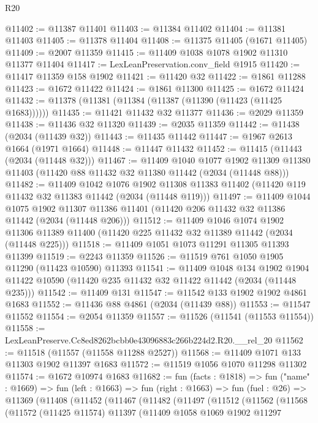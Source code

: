 \begin{lexlean}{R20}
\begin{coremodule}
@11402 := @11387 @11401
@11403 := @11384 @11402
@11404 := @11381 @11403
@11405 := @11378 @11404
@11408 := @11375 @11405 (@1671 @11405)
@11409 := @2007 @11359
@11415 := @11409 @1038 @1078 @1902 @11310 @11377 @11404
@11417 := LexLeanPreservation.conv_field @1915
@11420 := @11417 @11359 @158 @1902
@11421 := @11420 @32
@11422 := @1861 @11288
@11423 := @1672 @11422
@11424 := @1861 @11300
@11425 := @1672 @11424
@11432 := @11378 (@11381 (@11384 (@11387 (@11390 (@11423 (@11425 @1683))))))
@11435 := @11421 @11432 @32 @11377
@11436 := @2029 @11359
@11438 := @11436 @32 @11320
@11439 := @2035 @11359
@11442 := @11438 (@2034 (@11439 @32))
@11443 := @11435 @11442
@11447 := @1967 @2613 @1664 (@1971 @1664)
@11448 := @11447 @11432
@11452 := @11415 (@11443 (@2034 (@11448 @32)))
@11467 := @11409
    @1040
    @1077
    @1902
    @11309
    @11380
    @11403
    (@11420 @88 @11432 @32 @11380 @11442 (@2034 (@11448 @88)))
@11482 := @11409
    @1042
    @1076
    @1902
    @11308
    @11383
    @11402
    (@11420 @119 @11432 @32 @11383 @11442 (@2034 (@11448 @119)))
@11497 := @11409
    @1044
    @1075
    @1902
    @11307
    @11386
    @11401
    (@11420 @206 @11432 @32 @11386 @11442 (@2034 (@11448 @206)))
@11512 := @11409
    @1046
    @1074
    @1902
    @11306
    @11389
    @11400
    (@11420 @225 @11432 @32 @11389 @11442 (@2034 (@11448 @225)))
@11518 := @11409 @1051 @1073 @11291 @11305 @11393 @11399
@11519 := @2243 @11359
@11526 := @11519 @761 @1050 @1905 @11290 (@11423 @10590) @11393
@11541 := @11409
    @1048
    @134
    @1902
    @1904
    @11422
    @10590
    (@11420 @235 @11432 @32 @11422 @11442 (@2034 (@11448 @235)))
@11542 := @11409 @131
@11547 := @11542 @133 @1902 @1902 @4861 @1683
@11552 := @11436 @88 @4861 (@2034 (@11439 @88))
@11553 := @11547 @11552
@11554 := @2054 @11359
@11557 := @11526 (@11541 (@11553 @11554))
@11558 := LexLeanPreserve.Cc8ed8262bcbb0e43096883c266b224d2.R20.__rel_20
@11562 := @11518 (@11557 (@11558 @11288 @2527))
@11568 := @11409 @1071 @133 @11303 @1902 @11397 @1683
@11572 := @11519 @1056 @1070 @11298 @11302
@11574 := @1672 @10974 @1683
@11682 := fun (facts : @1818) =>
  fun ("name" : @1669) =>
  fun (left : @1663) =>
  fun (right : @1663) =>
  fun (fuel : @26) =>
  @11369
    (@11408
      (@11452
        (@11467
          (@11482
            (@11497
              (@11512
                (@11562
                  (@11568
                    (@11572
                      (@11425 @11574)
                      @11397
                      (@11409
                        @1058
                        @1069
                        @1902
                        @11297

\end{coremodule}
\end{lexlean}

